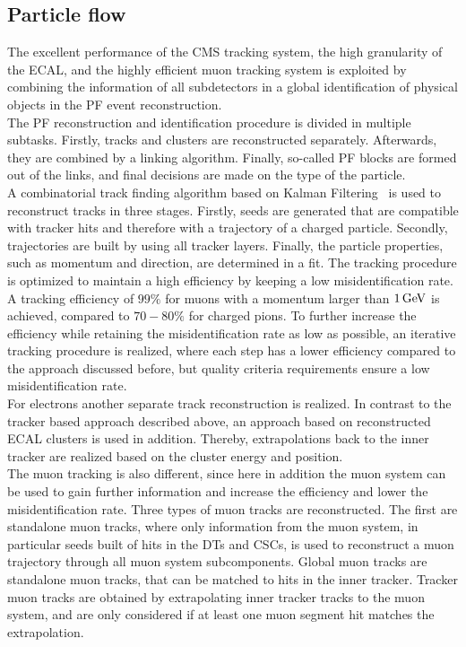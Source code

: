 \subsection{Particle flow}
The excellent performance of the CMS tracking system, the high granularity of the ECAL, and the highly efficient muon tracking system is exploited by combining the information of all subdetectors in a global identification of physical objects in the PF event reconstruction.\\
The PF reconstruction and identification procedure is divided in multiple subtasks. Firstly, tracks and clusters are reconstructed separately. Afterwards, they are combined by a linking algorithm. Finally, so-called PF blocks are formed out of the links, and final decisions are made on the type of the particle.\\
A combinatorial track finding algorithm based on Kalman Filtering~\cite{Kalman} is used to reconstruct tracks in three stages. Firstly, seeds are generated that are compatible with tracker hits and therefore with a trajectory of a charged particle. Secondly, trajectories are built by using all tracker layers. Finally, the particle properties, such as momentum and direction, are determined in a fit. The tracking procedure is optimized to maintain a high efficiency by keeping a low misidentification rate. A tracking efficiency of $99\%$ for muons with a momentum larger than $1\,\text{Ge\hspace{-.08em}V}$ is achieved, compared to $70-80\%$ for charged pions. To further increase the efficiency while retaining the misidentification rate as low as possible, an iterative tracking procedure is realized, where each step has a lower efficiency compared to the approach discussed before, but quality criteria requirements ensure a low misidentification rate.\\
For electrons another separate track reconstruction is realized. In contrast to the tracker based approach described above, an approach based on reconstructed ECAL clusters is used in addition. Thereby, extrapolations back to the inner tracker are realized based on the cluster energy and position.\\
The muon tracking is also different, since here in addition the muon system can be used to gain further information and increase the efficiency and lower the misidentification rate. Three types of muon tracks are reconstructed. The first are standalone muon tracks, where only information from the muon system, in particular seeds built of hits in the DTs and CSCs, is used to reconstruct a muon trajectory through all muon system subcomponents. Global muon tracks are standalone muon tracks, that can be matched to hits in the inner tracker. Tracker muon tracks are obtained by extrapolating inner tracker tracks to the muon system, and are only considered if at least one muon segment hit matches the extrapolation.\\
